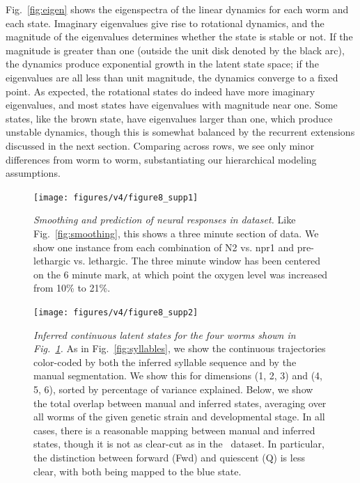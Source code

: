 \documentclass[11pt]{article}
\begin{document}
Fig.~\ref{fig:eigen} shows the eigenspectra of the linear
dynamics for each worm and each state.  Imaginary eigenvalues give
rise to rotational dynamics, and the magnitude of the eigenvalues
determines whether the state is stable or not.  If the magnitude is
greater than one (outside the unit disk denoted by the black arc),
the dynamics produce exponential growth in the latent state space; if
the eigenvalues are all less than unit magnitude, the dynamics converge
to a fixed point.  As expected, the rotational states do indeed have
more imaginary eigenvalues, and most states have eigenvalues with
magnitude near one.  Some states, like the brown state, have eigenvalues
larger than one, which produce unstable dynamics, though this is
somewhat balanced by the recurrent extensions discussed in the next
section.  Comparing across rows, we see only minor differences from worm
to worm, substantiating our hierarchical modeling assumptions.

\begin{figure}[t!]
\centering%
\texttt{[image: figures/v4/figure8\_supp1]} 
\caption{\textit{Smoothing and prediction of neural responses
    in \citet{nichols2017global} dataset.} Like Fig.~\ref{fig:smoothing},
  this shows a three minute section of data.  We show one instance
  from each combination of N2 vs. npr1 and pre-lethargic vs. lethargic.
  The three minute window has been centered on the 6 minute mark, at
  which point the oxygen level was increased from 10\% to 21\%.  }
\label{fig:nichols_supp1}
\end{figure}


\begin{figure}[t!]
\centering%
\texttt{[image: figures/v4/figure8\_supp2]} 
\caption{\textit{Inferred continuous latent states for the four worms
    shown in Fig.~\ref{fig:nichols_supp1}.} As in
  Fig.~\ref{fig:syllables}, we show the continuous trajectories
  color-coded by both the inferred syllable sequence and by the manual
  segmentation. We show this for dimensions (1, 2, 3) and (4, 5, 6),
  sorted by percentage of variance explained. Below, we show the total
  overlap between manual and inferred states, averaging over all worms
  of the given genetic strain and developmental stage.  In all cases,
  there is a reasonable mapping between manual and inferred states,
  though it is not as clear-cut as in the~\citet{kato2015global}
  dataset. In particular, the distinction between forward (Fwd) and
  quiescent (Q) is less clear, with both being mapped to the blue
  state.}
\label{fig:nichols_supp2}
\end{figure}
\end{document}
